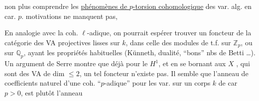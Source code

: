 
non plus comprendre les \uline{phénomènes de $p$-torsion cohomologique} des var. alg. en car. $p$.  motivations  ne manquent pas,  


En analogie avec la coh. $\ell$-adique, on pourrait espérer trouver un foncteur
de la catégorie des VA projectives lisses sur $k$, dans celle des modules de t.f. sur $\mathbb Z_p$, ou sur $\mathbb Q_p$, ayant les propriétés habituelles  (Künneth, dualité, ``bons'' nbs de Betti \ldots). Un argument de Serre montre que déjà pour le $H^1$, et en se bornant aux $X$ , qui sont des VA de dim $\leq 2$, un tel foncteur n'existe pas. Il semble que l'anneau de coefficients naturel d'une coh. ``$p$-adique'' pour les var. sur un corps $k$ de car $p>0$, est plutôt l'anneau

